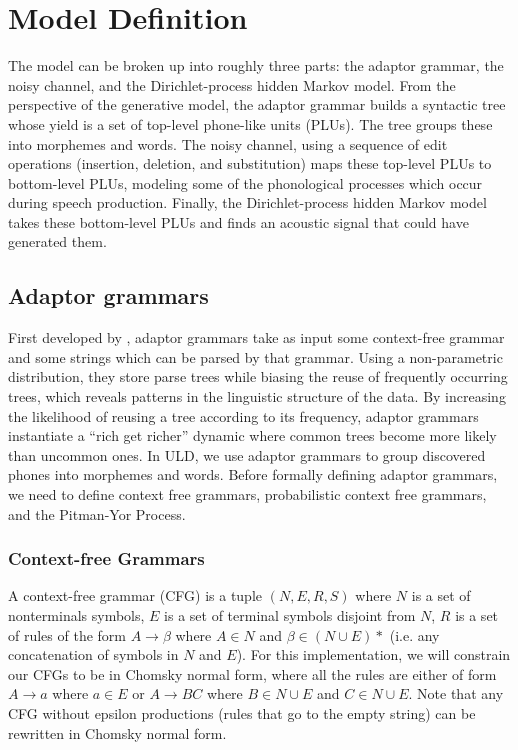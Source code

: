 \documentclass[12pt,letterpaper]{article}
\begin{document}
\section{Model Definition}
The model can be broken up into roughly three parts: the adaptor grammar, the noisy channel, and the Dirichlet-process hidden Markov model. From the perspective of the generative model, the adaptor grammar builds a syntactic tree whose yield is a set of top-level phone-like units (PLUs). The tree groups these into morphemes and words. The noisy channel, using a sequence of edit operations (insertion, deletion, and substitution) maps these top-level PLUs to bottom-level PLUs, modeling some of the phonological processes which occur during speech production. Finally, the Dirichlet-process hidden Markov model takes these bottom-level PLUs and finds an acoustic signal that could have generated them. 

\subsection{Adaptor grammars}
First developed by \citet{Johnson:2007}, adaptor grammars take as input some context-free grammar and some strings which can be parsed by that grammar. Using a non-parametric distribution, they store parse trees while biasing the reuse of frequently occurring trees, which reveals patterns in the linguistic structure of the data. By increasing the likelihood of reusing a tree according to its frequency, adaptor grammars instantiate a ``rich get richer'' dynamic where common trees become more likely than uncommon ones. In ULD, we use adaptor grammars to group discovered phones into morphemes and words. Before formally defining adaptor grammars, we need to define context free grammars, probabilistic context free grammars, and the Pitman-Yor Process.

\subsubsection{Context-free Grammars}
A context-free grammar (CFG) is a tuple $(N, E, R, S)$ where $N$ is a set of nonterminals symbols, $E$ is a set of terminal symbols disjoint from $N$, $R$ is a set of rules of the form $A \rightarrow \beta$ where $A \in N$ and $\beta \in (N \cup E)*$ (i.e. any concatenation of symbols in $N$ and $E$). For this implementation, we will constrain our CFGs to be in Chomsky normal form, where all the rules are either of form $A \rightarrow a$ where $a \in E$ or $A \rightarrow BC$ where $B\in N\cup E$ and $C\in N\cup E$. Note that any CFG without epsilon productions (rules that go to the empty string) can be rewritten in Chomsky normal form. \citep{hill:1979}  
\end{document}
